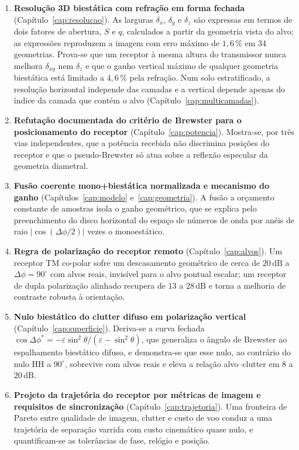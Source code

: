 \documentclass[12pt,a4paper,oneside]{book}
\theoremstyle{remark}
\newcommand{\dB}{\,\mathrm{dB}}
\theoremstyle{plain}
\theoremstyle{definition}
\begin{document}
\begin{enumerate}
  \item \textbf{Resolução 3D biestática com refração em forma fechada}
  (Capítulo~\ref{cap:resolucao}). As larguras $\delta_x$, $\delta_y$ e
  $\delta_z$ são expressas em termos de dois fatores de abertura, $S$ e $q$,
  calculados a partir da geometria vista do alvo; as expressões reproduzem a
  imagem com erro máximo de $1,6\,\%$ em 34 geometrias. Prova-se que um
  receptor à mesma altura do transmissor nunca melhora $\delta_{xy}$ nem
  $\delta_z$ e que o ganho vertical máximo de qualquer geometria biestática
  está limitado a $4,6\,\%$ pela refração. Num solo estratificado, a resolução
  horizontal independe das camadas e a vertical depende apenas do índice da
  camada que contém o alvo (Capítulo~\ref{cap:multicamadas}).

  \item \textbf{Refutação documentada do critério de Brewster para o
  posicionamento do receptor} (Capítulo~\ref{cap:potencia}). Mostra-se, por
  três vias independentes, que a potência recebida não discrimina posições do
  receptor e que o pseudo-Brewster só atua sobre a reflexão especular da
  geometria diametral.

  \item \textbf{Fusão coerente mono+biestática normalizada e mecanismo do
  ganho} (Capítulos~\ref{cap:modelo} e~\ref{cap:geometria}). A fusão a
  orçamento constante de amostras isola o ganho geométrico, que se explica
  pelo preenchimento do disco horizontal do espaço de números de onda por
  anéis de raio $|\cos(\Delta\phi/2)|$ vezes o monoestático.

  \item \textbf{Regra de polarização do receptor remoto}
  (Capítulo~\ref{cap:alvos}). Um receptor TM co-polar sofre um descasamento
  geométrico de cerca de $20\dB$ a $\Delta\phi=90^\circ$ com alvos reais,
  invisível para o alvo pontual escalar; um receptor de dupla polarização
  alinhado recupera de $13$ a $28\dB$ e torna a melhoria de contraste robusta
  à orientação.

  \item \textbf{Nulo biestático do clutter difuso em polarização vertical}
  (Capítulo~\ref{cap:superficie}). Deriva-se a curva fechada
  $\cos\Delta\phi^\ast = -\varepsilon\sin^2\theta/(\varepsilon-\sin^2\theta)$,
  que generaliza o ângulo de Brewster ao espalhamento biestático difuso, e
  demonstra-se que esse nulo, ao contrário do nulo HH a $90^\circ$, sobrevive
  com alvos reais e eleva a relação alvo--clutter em $8$ a $20\dB$.

  \item \textbf{Projeto da trajetória do receptor por métricas de imagem e
  requisitos de sincronização} (Capítulo~\ref{cap:trajetoria}). Uma fronteira
  de Pareto entre qualidade de imagem, clutter e custo de voo conduz a uma
  trajetória de separação varrida com custo cinemático quase nulo, e
  quantificam-se as tolerâncias de fase, relógio e posição.
\end{enumerate}
\end{document}
